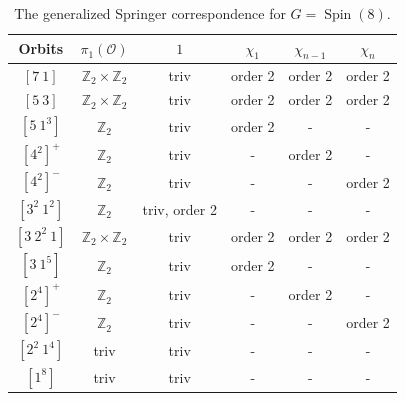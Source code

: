 \documentclass[reqno,11pt]{amsart}
\theoremstyle{remark}
\theoremstyle{remark}
\theoremstyle{definition}
\theoremstyle{definition}
\theoremstyle{definition}
\numberwithin{equation}{section}
\newcommand{\Spin}{\operatorname{Spin}}
\newcommand{\co}{\mathcal{O}}
\begin{document}
\begin{table}[h]
\begin{tabular}{|c|c|c|c|c|c|}
\hline
Orbits & $\pi_1(\co)$ & $1$ & $\chi_{1}$ & $\chi_{n-1}$ & $\chi_{n}$\\
\hline
$[7\ 1]$ & $\mathbb Z_2\times \mathbb Z_2$ & triv & order 2 & order 2 & order 2\\
$[5\ 3]$ &  $\mathbb Z_2\times \mathbb Z_2$ & triv & order 2 & order 2 & order 2\\
$[5\ 1^3]$ & $ \mathbb Z_2$ & triv & order 2 & - & -\\
$[4^2]^+$ &  $\mathbb Z_2$ & triv & - & order 2 & -\\
$[4^2]^- $&  $\mathbb Z_2$ & triv & - & - & order 2\\
$[3^2\ 1^2]$ &$ \mathbb Z_2$ & triv, order 2 & - & - & -\\
$[3\ 2^2\ 1]$ & $\mathbb Z_2\times \mathbb Z_2$ & triv & order 2 & order 2 & order 2\\
$[3\ 1^5]$ & $ \mathbb Z_2$ & triv & order 2 & - & -\\
$[2^4]^+$ &  $\mathbb Z_2$ & triv & - & order 2 & -\\
$[2^4]^- $&  $\mathbb Z_2$ & triv & - & - & order 2\\
$[2^2\ 1^4]$ & triv & triv & - & - & -\\
$[1^8]$ & triv & triv & - & -& -\\
\hline
\end{tabular}
\medskip
\caption{The generalized Springer correspondence for $G=\Spin(8)$.} \label{fig.D4}
\end{table}






%	
%	
\end{document}
